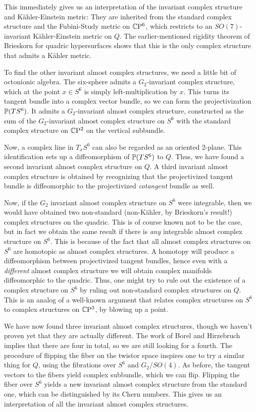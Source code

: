 \documentclass[parskip=half]{scrartcl}
\begin{document}
This immediately gives us an interpretation of the invariant complex structure and K\"ahler-Einstein metric: They are inherited from the standard complex structure and the Fubini-Study metric on $\CP^6$, which restricts to an $SO(7)$-invariant K\"ahler-Einstein metric on $Q$. The earlier-mentioned rigidity theorem of Brieskorn for quadric hypersurfaces shows that this is the only complex structure that admits a K\"ahler metric.

To find the other invariant almost complex structures, we need a little bit of octonionic algebra. The six-sphere admits a $G_2$-invariant complex structure, which at the point $x\in S^6$ is simply left-multiplication by $x$. This turns its tangent bundle into a complex vector bundle, so we can form the projectivization $\P(TS^6)$. It admits a $G_2$-invariant almost complex structure, constructed as the sum of the $G_2$-invariant almost complex structure on $S^6$ with the standard complex structure on $\CP^2$ on the vertical subbundle.

Now, a complex line in $T_x S^6$ can also be regarded as an oriented 2-plane. This identification sets up a diffeomorphism of $\P(TS^6)$ to $Q$. Thus, we have found a second invariant almost complex structure on $Q$. A third invariant almost complex structure is obtained by recognizing that the projectivized tangent bundle is diffeomorphic to the projectivized \emph{cotangent} bundle as well.

Now, if the $G_2$ invariant almost complex structure on $S^6$ were integrable, then we would have obtained two non-standard (non-K\"ahler, by Brieskorn's result!) complex structures on the quadric. This is of course known not to be the case, but in fact we obtain the same result if there is \emph{any} integrable almost complex structure on $S^6$. This is because of the fact that all almost complex structures on $S^6$ are homotopic as almost complex structures. A homotopy will produce a diffeomorphism between projectivized tangent bundles, hence even with a \emph{different} almost complex structure we will obtain complex manifolds diffeomorphic to the quadric. Thus, one might try to rule out the existence of a complex structure on $S^6$ by ruling out non-standard complex structures on $Q$. This is an analog of a well-known argument that relates complex structures on $S^6$ to complex structures on $\CP^3$, by blowing up a point.

We have now found three invariant almost complex structures, though we haven't proven yet that they are actually different. The work of Borel and Hirzebruch implies that there are four in total, so we are still looking for a fourth. The procedure of flipping the fiber on the twistor space inspires one to try a similar thing for $Q$, using the fibrations over $S^6$ and $G_2/SO(4)$. As before, the tangent vectors to the fibers yield complex subbundle, which we can flip. Flipping the fiber over $S^6$ yields a new invariant almost complex structure from the standard one, which can be distinguished by its Chern numbers. This gives us an interpretation of all the invariant almost complex structures. 
\end{document}
